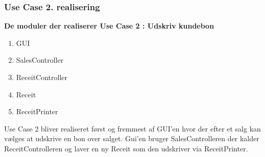 \subsubsection{ Use Case 2. realisering	}
\textbf{De moduler der realiserer Use Case 2 : Udskriv kundebon}

\begin{enumerate}
	\item GUI
	\item SalesController
	\item ReceitController
	\item Receit
	\item ReceitPrinter
\end{enumerate}

Use Case 2 bliver realiseret først og fremmest af GUI'en hvor der efter et salg kan vælges at udskrive en bon over salget. Gui'en bruger SalesControlleren der kalder ReceitControlleren og laver en ny Receit som den udskriver via ReceitPrinter. 